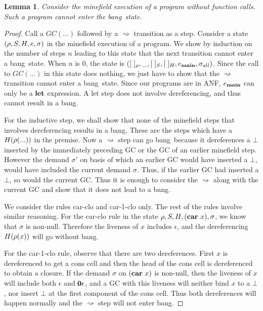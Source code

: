 \documentclass[preprint,9pt]{sigplanconf}
\newcommand{\bang}{\mbox{\sc bang}}
\newtheorem{lemma}[theorem]{Lemma}
\begin{document}
\begin{lemma}
\label{lemma:call-less-cannot-go-bang}
Consider the minefield execution of  a program without function calls.
Such a program cannot enter the \bang\ state.
\end{lemma}
\begin{proof}
Call a $GC(\ldots)$  followed by a $\rightsquigarrow$  transition as a
step. Consider a state $(\rho, S,  H, e, \sigma)$ in the minefield
execution of a  program.  We show by induction on  the number of steps
$n$ leading  to this  state that  the next  transition cannot  enter a
\bang\ state.  When $n$ is 0,  the state is $([\;]_\rho,\_, [\;]_{S} ,
            [\;]_{H},  e_{\mathbf{main}},  \sigma_{all})$.   Since  the
            call to $GC(\ldots)$  in this state does  nothing, we just
            have to show that the $\rightsquigarrow$ transition cannot
            enter  a \bang\  state.  Since  our programs  are in  ANF,
            $e_{\mathbf{main}}$ can  only be  a $\mbox{$\mathbf{ let}$}$ expression.   A {\sc
              let}  step  does  not involve  dereferencing,  and  thus
            cannot result in a \bang.

For the inductive step, we shall show that none of the minefield steps
that involves dereferencing  results in a \bang.  These  are the steps
which  have a  $H(\rho(...))$ in  the  premise. 
Now a  $\rightsquigarrow$ step can  go
\bang\ because it dereferences a $\bot$ inserted by the
immediately  preceding  GC  or  the GC  of  an  earlier
minefield step.  However the  demand $\sigma'$
  on basis of which an earlier GC would have inserted a
  $\bot$,  would  have   included  the  current  demand
  $\sigma$.  Thus,  if the  earlier GC had  inserted a
$\bot$, so would the current  GC.  Thus it is enough to
consider the $\rightsquigarrow$  along with the current
GC and show that it does not lead to a \bang.

We consider the rules {\sc car-clo} and {\sc car-1-clo} only.  
The rest  of the rules involve similar reasoning. For the {\sc
  car-clo}  rule in  the state  $\rho, S,  H, (\mbox{$\mathbf{car}$}~x),
\sigma$, we  know that $\sigma$ is  non-null. Therefore
the  liveness  of  $x$  includes  $\epsilon$,  and  the
dereferencing $H(\rho(x))$ will go without \bang.

For the  {\sc car-1-clo}  rule, observe that  there are
two dereferences.  First $x$  is dereferenced to  get a
cons  cell  and then  the  head  of  the cons  cell  is
dereferenced  to  obtain  a  closure.   If  the  demand
$\sigma$ on  $(\mbox{$\mathbf{car}$}~x)$ is non-null, then  the liveness
of    $x$   will    include    both   $\epsilon$    and
$\mathbf{0}\epsilon$,  and  a  GC with  this  liveness  will
neither bind $x$ to a  $\bot$, nor insert $\bot$ at the
first   component  of   the   cons   cell.  Thus   both
dereferences    will    happen   normally    and    the
$\rightsquigarrow$ step will not enter \bang.
\end{proof} 
\end{document}
